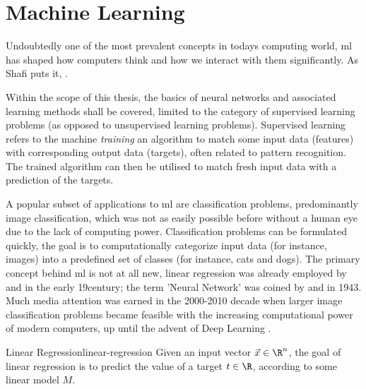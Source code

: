 \pagebreak
\section{Machine Learning}
\label{sec:machine-learning}
Undoubtedly one of the most prevalent concepts in todays computing world, \gls{ml} has shaped how computers think and how we interact with them significantly.
As Shafi  puts it, .

Within the scope of this thesis, the basics of neural networks and associated learning methods shall be covered, limited to the category of supervised learning problems (as opposed to unsupervised learning problems).
Supervised learning refers to the machine \textit{training} an algorithm to match some input data (features) with corresponding output data (targets), often related to pattern recognition.
The trained algorithm can then be utilised to match fresh input data with a prediction of the targets.

A popular subset of applications to \gls{ml} are classification problems, predominantly image classification, which was not as easily possible before without a human eye due to the lack of computing power.
Classification problems can be formulated quickly, the goal is to computationally categorize input data (for instance, images) into a predefined set of classes (for instance, cats and dogs).
The primary concept behind \acrlong{ml} is not at all new, linear regression was already employed by  and  in the early 19\th century; the term 'Neural Network' was coined by  and  in 1943.
Much media attention was earned in the 2000-2010 decade when larger image classification problems became feasible with the increasing computational power of modern computers, up until the advent of Deep Learning \parencite{bishop-pattern-recognition-and-ml}.

\begin{definition}{Linear Regression}{linear-regression}
  Given an input vector $\vec{x} \in \R^n$, the goal of linear regression is to predict the value of a target $t \in \R$, according to some linear model $M$.
\end{definition}

